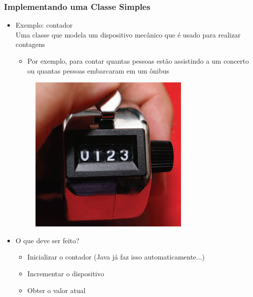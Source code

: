 \documentclass[xcolor={dvipsnames,table},aspectratio=169]{beamer}
\begin{document}
\begin{frame}\frametitle{Implementando uma Classe Simples}
\begin{itemize}
	\item Exemplo: contador\\Uma classe que modela um dispositivo mecânico que é usado para realizar contagens
	\begin{itemize}
		\item Por exemplo, para contar quantas pessoas estão assistindo a um concerto ou quantas pessoas embarcaram em um ônibus
	\end{itemize}
\begin{figure}[h]
	\includegraphics[height=0.25\paperheight,center]{pucrs-ep-fprog-unidade_07-objetos_e_classes-laminas-tally_counter.jpg}
\end{figure}
	\item O que deve ser feito?
	\begin{itemize}
		\item Inicializar o contador (Java já faz isso automaticamente...)
		\item Incrementar o dispositivo
		\item Obter o valor atual
	\end{itemize}
\end{itemize}
\end{frame}
\end{document}
